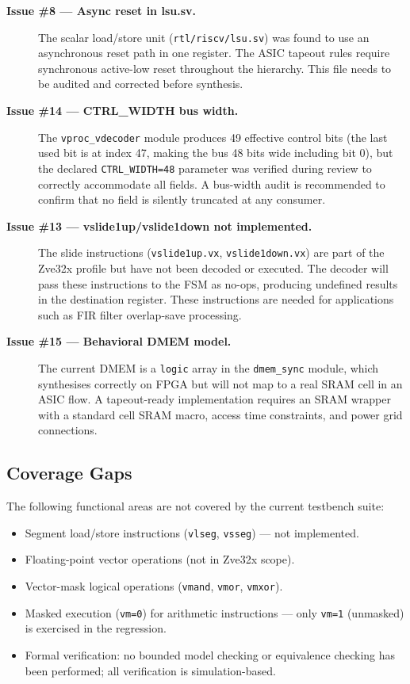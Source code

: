 \begin{description}
  \item[\textbf{Issue \#8 — Async reset in lsu.sv.}]
    The scalar load/store unit (\texttt{rtl/riscv/lsu.sv}) was found to use an
    asynchronous reset path in one register. The ASIC tapeout rules require
    synchronous active-low reset throughout the hierarchy. This file needs to be
    audited and corrected before synthesis.

  \item[\textbf{Issue \#14 — CTRL\_WIDTH bus width.}]
    The \texttt{vproc\_vdecoder} module produces 49 effective control bits (the
    last used bit is at index 47, making the bus 48 bits wide including bit 0), but
    the declared \texttt{CTRL\_WIDTH=48} parameter was verified during review to
    correctly accommodate all fields. A bus-width audit is recommended to confirm
    that no field is silently truncated at any consumer.

  \item[\textbf{Issue \#13 — vslide1up/vslide1down not implemented.}]
    The slide instructions (\texttt{vslide1up.vx}, \texttt{vslide1down.vx}) are
    part of the Zve32x profile but have not been decoded or executed. The decoder
    will pass these instructions to the FSM as no-ops, producing undefined results
    in the destination register. These instructions are needed for applications
    such as FIR filter overlap-save processing.

  \item[\textbf{Issue \#15 — Behavioral DMEM model.}]
    The current DMEM is a \texttt{logic} array in the \texttt{dmem\_sync} module,
    which synthesises correctly on FPGA but will not map to a real SRAM cell in an
    ASIC flow. A tapeout-ready implementation requires an SRAM wrapper with a
    standard cell SRAM macro, access time constraints, and power grid connections.
\end{description}

\subsection{Coverage Gaps}

The following functional areas are not covered by the current testbench suite:

\begin{itemize}
  \item Segment load/store instructions (\texttt{vlseg}, \texttt{vsseg}) — not implemented.
  \item Floating-point vector operations (not in Zve32x scope).
  \item Vector-mask logical operations (\texttt{vmand}, \texttt{vmor}, \texttt{vmxor}).
  \item Masked execution (\texttt{vm=0}) for arithmetic instructions — only
        \texttt{vm=1} (unmasked) is exercised in the regression.
  \item Formal verification: no bounded model checking or equivalence checking
        has been performed; all verification is simulation-based.
\end{itemize}

